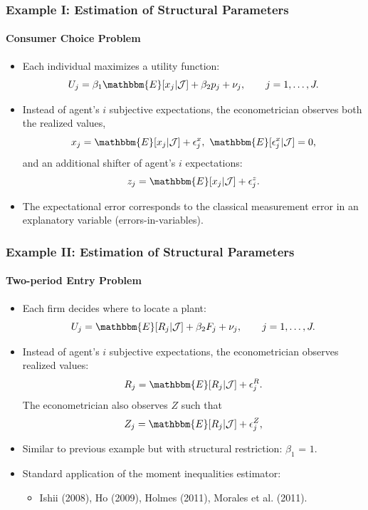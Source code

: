\documentclass[10pt,letterpaper]{beamer}
\begin{document}
\begin{frame}
\frametitle{Example I: Estimation of Structural Parameters}
\framesubtitle{Consumer Choice Problem}

\begin{itemize}
	\item Each individual maximizes a utility function:
	\begin{equation*}
	U_{j}=\beta_{1}\mathbbm{E}[x_{j}|\mathcal{J}] +\beta_{2}p_{j}+ \nu_{j},\qquad  j = 1,\dots,J.
	\end{equation*}
	\item Instead of agent's $i$ subjective expectations, the econometrician observes both the realized values,
	\begin{equation*}
	x_{j} = \mathbbm{E}[x_{j}|\mathcal{J}] + \epsilon^{x}_{j},\text{ $\mathbbm{E}[\epsilon^{x}_{j}|\mathcal{J}]=0$,}
	\end{equation*}
	and an additional shifter of agent's $i$ expectations:
	\begin{equation*}
	z_{j} = \mathbbm{E}[x_{j}|\mathcal{J}] + \epsilon^{z}_{j}.
	\end{equation*}
	\item The expectational error corresponds to the classical measurement error in an explanatory variable (errors-in-variables).
\end{itemize}
\end{frame}
\begin{frame}
\frametitle{Example II: Estimation of Structural Parameters}
\framesubtitle{Two-period Entry Problem}

\begin{itemize}
	\item Each firm decides where to locate a plant:
	\begin{equation*}
	U_{j}=\mathbbm{E}[R_{j}|\mathcal{J}] +\beta_{2}F_{j}+ \nu_{j},\qquad  j = 1,\dots,J.
	\end{equation*}
	\item Instead of agent's $i$ subjective expectations, the econometrician observes realized values:
	\begin{equation*}
	R_{j} = \mathbbm{E}[R_{j}|\mathcal{J}] + \epsilon^{R}_{j}.
	\end{equation*}
	The econometrician also observes $Z$ such that
	\begin{equation*}
	Z_{j} = \mathbbm{E}[R_{j}|\mathcal{J}] + \epsilon^{Z}_{j},
	\end{equation*}
	\item Similar to previous example but with structural restriction: $\beta_{1}$ = $1$.
	\item Standard application of the moment inequalities estimator:
	\begin{itemize}
		\item Ishii (2008), Ho (2009), Holmes (2011), Morales et al. (2011).
	\end{itemize}
\end{itemize}
\end{frame}
\end{document}
